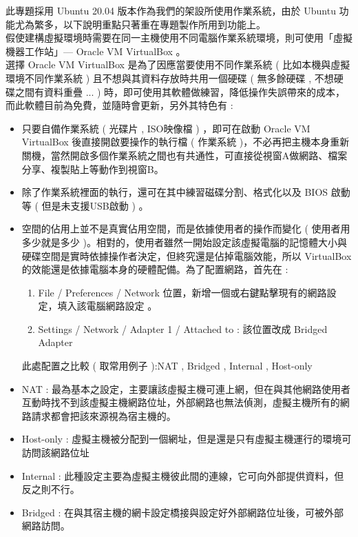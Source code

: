 \documentclass[14pt,a4paper]{report}  %
\begin{document}
 此專題採用 Ubuntu 20.04 版本作為我們的架設所使用作業系統，由於 Ubuntu 功能尤為繁多，以下說明重點只著重在專題製作所用到功能上。\\
假使建構虛擬環境時需要在同一主機使用不同電腦作業系統環境，則可使用「虛擬機器工作站」— Oracle VM VirtualBox 。\\

 選擇 Oracle VM VirtualBox    是為了因應當要使用不同作業系統 ( 比如本機與虛擬環境不同作業系統  ) 且不想與其資料存放時共用一個硬碟 ( 無多餘硬碟 , 不想硬碟之間有資料重疊 ... ) 時，即可使用其軟體做練習，降低操作失誤帶來的成本，而此軟體目前為免費，並隨時會更新，另外其特色有 :\\  
\begin{itemize}


\item 只要自備作業系統 ( 光碟片 , ISO映像檔 ) ，即可在啟動 Oracle VM VirtualBox  後直接開啟要操作的執行檔 ( 作業系統 )，不必再把主機本身重新關機，當然開啟多個作業系統之間也有共通性，可直接從視窗A做網路、檔案分享、複製貼上等動作到視窗B。\\
\item 除了作業系統裡面的執行，還可在其中練習磁碟分割、格式化以及 BIOS 啟動等 ( 但是未支援USB啟動 ) 。\\
\item 空間的佔用上並不是真實佔用空間，而是依據使用者的操作而變化 ( 使用者用多少就是多少 )。相對的，使用者雖然一開始設定該虛擬電腦的記憶體大小與硬碟空間是實時依據操作者決定，但終究還是佔掉電腦效能，所以 VirtualBox 的效能還是依據電腦本身的硬體配備。為了配置網路，首先在 : \\
\begin{enumerate}
\item File / Preferences / Network  位置，新增一個或右鍵點擊現有的網路設定，填入該電腦網路設定 。
\item Settings / Network / Adapter 1 / Attached to :  該位置改成  Bridged Adapter
\end{enumerate}
\qquad 此處配置之比較 ( 取常用例子 ):NAT , Bridged , Internal , Host-only
\item NAT : 最為基本之設定，主要讓該虛擬主機可連上網，但在與其他網路使用者互動時找不到該虛擬主機網路位址，外部網路也無法偵測，虛擬主機所有的網路請求都會把該來源視為宿主機的。
\item Host-only : 虛擬主機被分配到一個網址，但是還是只有虛擬主機運行的環境可訪問該網路位址
\item Internal : 此種設定主要為虛擬主機彼此間的連線，它可向外部提供資料，但反之則不行。
\item Bridged : 在與其宿主機的網卡設定橋接與設定好外部網路位址後，可被外部網路訪問。
\end{itemize}
\newpage
\end{document}
